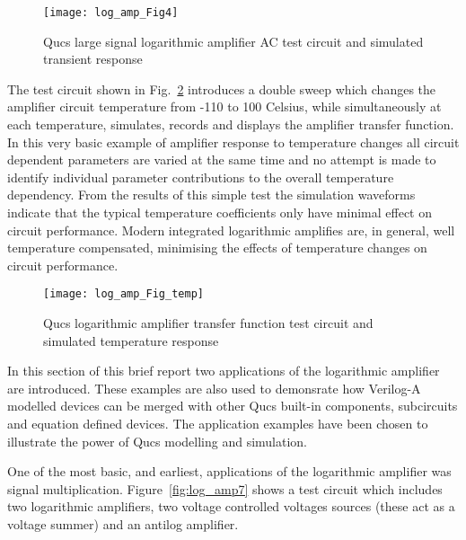 \begin{figure} [h]
  \centering
  \texttt{[image: log\_amp\_Fig4]}
  \caption{Qucs large signal logarithmic amplifier AC test circuit and simulated transient response}
  \label{fig:log_amp4}  
\end{figure} 



The test circuit shown in Fig.~\ref{fig:log_amp_temp} introduces a
double sweep which changes the amplifier circuit temperature from -110
to 100 Celsius, while simultaneously at each temperature, simulates,
records and displays the amplifier transfer function. In this very
basic example of amplifier response to temperature changes all circuit
dependent parameters are varied at the same time and no attempt is
made to identify individual parameter contributions to the overall
temperature dependency. From the results of this simple test the
simulation waveforms indicate that the typical temperature
coefficients only have minimal effect on circuit performance. Modern
integrated logarithmic amplifies are, in general, well temperature
compensated, minimising the effects of temperature changes on circuit
performance.

\begin{figure} [h]
  \centering
  \texttt{[image: log\_amp\_Fig\_temp]}
  \caption{Qucs logarithmic amplifier transfer function test circuit and simulated temperature response}
  \label{fig:log_amp_temp}
\end{figure} 



In this section of this brief report two applications of the
logarithmic amplifier are introduced. These examples are also used to
demonsrate how Verilog-A modelled devices can be merged with other
Qucs built-in components, subcircuits and equation defined
devices. The application examples have been chosen to illustrate the
power of Qucs modelling and simulation.


One of the most basic, and earliest, applications of the logarithmic
amplifier was signal multiplication. Figure~\ref{fig:log_amp7} shows a
test circuit which includes two logarithmic amplifiers, two voltage
controlled voltages sources (these act as a voltage summer) and an
antilog amplifier.


